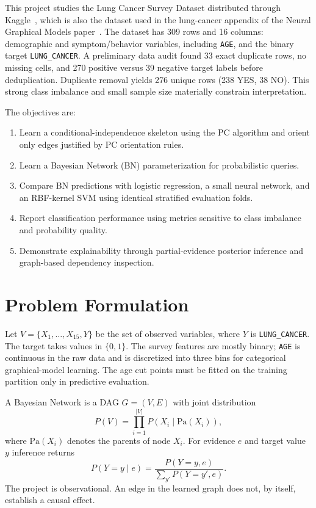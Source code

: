 \documentclass[10pt,twocolumn,letterpaper]{article}
\newcommand{\vn}[1]{{\small\texttt{#1}}}
\begin{document}
	This project studies the Lung Cancer Survey Dataset distributed through Kaggle~\cite{b2}, which is also the dataset used in the lung-cancer appendix of the Neural Graphical Models paper~\cite{b1}. The dataset has 309 rows and 16 columns: demographic and symptom/behavior variables, including \vn{AGE}, and the binary target \vn{LUNG\_CANCER}. A preliminary data audit found 33 exact duplicate rows, no missing cells, and 270 positive versus 39 negative target labels before deduplication. Duplicate removal yields 276 unique rows (238 YES, 38 NO). This strong class imbalance and small sample size materially constrain interpretation.

	The objectives are:
	\begin{enumerate}
		\item Learn a conditional-independence skeleton using the PC algorithm and orient only edges justified by PC orientation rules.
		\item Learn a Bayesian Network (BN) parameterization for probabilistic queries.
		\item Compare BN predictions with logistic regression, a small neural network, and an RBF-kernel SVM using identical stratified evaluation folds.
		\item Report classification performance using metrics sensitive to class imbalance and probability quality.
		\item Demonstrate explainability through partial-evidence posterior inference and graph-based dependency inspection.
	\end{enumerate}

	\section{Problem Formulation}
	Let \(V = \{X_{1},\ldots ,X_{15},Y\}\) be the set of observed variables, where \(Y\) is \vn{LUNG\_CANCER}. The target takes values in \(\{0,1\}\). The survey features are mostly binary; \vn{AGE} is continuous in the raw data and is discretized into three bins for categorical graphical-model learning. The age cut points must be fitted on the training partition only in predictive evaluation.

	A Bayesian Network is a DAG \(G = (V,E)\) with joint distribution
	\begin{equation}
		P(V) = \prod_{i = 1}^{|V|}P(X_i\mid \mathrm{Pa}(X_i)),
	\end{equation}
	where \(\mathrm{Pa}(X_i)\) denotes the parents of node \(X_{i}\). For evidence \(e\) and target value \(y\) inference returns
	\begin{equation}
		P(Y = y\mid e) = \frac{P(Y = y,e)}{\sum_{y'}P(Y = y',e)}.
	\end{equation}
	The project is observational. An edge in the learned graph does not, by itself, establish a causal effect.
\end{document}
